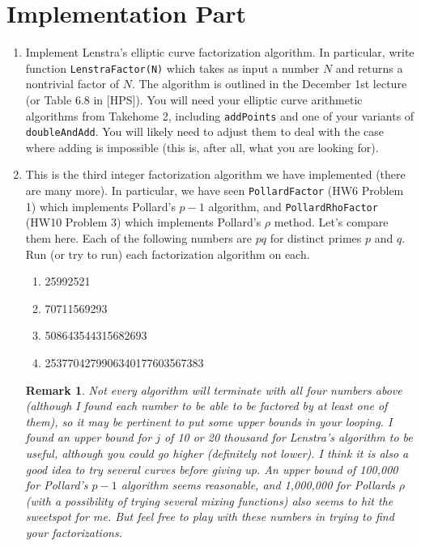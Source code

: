 \documentclass[11pt]{article}
\newtheorem*{remark}{Remark}
\begin{document}
\section*{Implementation Part}
\begin{enumerate}
  \item{
  Implement Lenstra's elliptic curve factorization algorithm.  In particular, write function \verb|LenstraFactor(N)| which takes as input a number $N$ and returns a nontrivial factor of $N$.  The algorithm is outlined in the December 1st lecture (or Table 6.8 in [HPS]).  You will need your elliptic curve arithmetic algorithms from Takehome 2, including \verb|addPoints| and one of your variants of \verb|doubleAndAdd|.  You will likely need to adjust them to deal with the case where adding is impossible (this is, after all, what you are looking for).
  }
  \item{
  This is the third integer factorization algorithm we have implemented (there are many more).  In particular, we have seen \verb|PollardFactor| (HW6 Problem 1) which implements Pollard's $p-1$ algorithm, and \verb|PollardRhoFactor|
  (HW10 Problem 3) which implements Pollard's $\rho$ method.  Let's compare them here.  Each of the following numbers are $pq$ for distinct primes $p$ and $q$.  Run (or try to run) each factorization algorithm on each.
  \begin{enumerate}
    \item{25992521}
    \item{70711569293}
    \item{508643544315682693}
    \item{2537704279906340177603567383}
  \end{enumerate}
  }
  \begin{remark}
    Not every algorithm will terminate with all four numbers above (although I found each number to be able to be factored by at least one of them), so it may be pertinent to put some upper bounds in your looping.  I found an upper bound for $j$ of 10 or 20 thousand for Lenstra's algorithm to be useful, although you could go higher (definitely not lower).  I think it is also a good idea to try several curves before giving up.  An upper bound of 100,000 for Pollard's $p-1$ algorithm seems reasonable, and 1,000,000 for Pollards $\rho$ (with a possibility of trying several mixing functions) also seems to hit the sweetspot for me.  But feel free to play with these numbers in trying to find your factorizations.
  \end{remark}
\end{enumerate}
\end{document}
